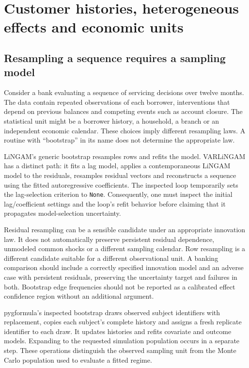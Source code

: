 \chapter{Customer histories, heterogeneous effects and economic units}
\label{v131:histories-forests}

\section{Resampling a sequence requires a sampling model}

Consider a bank evaluating a sequence of servicing decisions over twelve
months. The data contain repeated observations of each borrower, interventions
that depend on previous balances and competing events such as account closure.
The statistical unit might be a borrower history, a household, a branch or an
independent economic calendar. These choices imply different resampling laws.
A routine with ``bootstrap'' in its name does not determine the appropriate law.

LiNGAM's generic bootstrap resamples rows and refits the model. VARLiNGAM has
a distinct path: it fits a lag model, applies a contemporaneous LiNGAM model to
the residuals, resamples residual vectors and reconstructs a sequence using the
fitted autoregressive coefficients. The inspected loop temporarily sets the
lag-selection criterion to \texttt{None}. Consequently, one must inspect the
initial lag/coefficient settings and the loop's refit behavior before claiming
that it propagates model-selection uncertainty.\cite{v131_sw_lingam}

Residual resampling can be a sensible candidate under an appropriate innovation
law. It does not automatically preserve persistent residual dependence,
unmodeled common shocks or a different sampling calendar. Row resampling is a
different candidate suitable for a different observational unit. A banking
comparison should include a correctly specified innovation model and an adverse
case with persistent residuals, preserving the uncertainty target and failures
in both. Bootstrap edge frequencies should not be reported as a calibrated
effect confidence region without an additional argument.

pygformula's inspected bootstrap draws observed subject identifiers with
replacement, copies each subject's complete history and assigns a fresh replicate
identifier to each draw. It updates histories and refits covariate and outcome
models. Expanding to the requested simulation population occurs in a separate
step. These operations distinguish the observed sampling unit from the Monte
Carlo population used to evaluate a fitted regime.\cite{v131_sw_pygformula}

